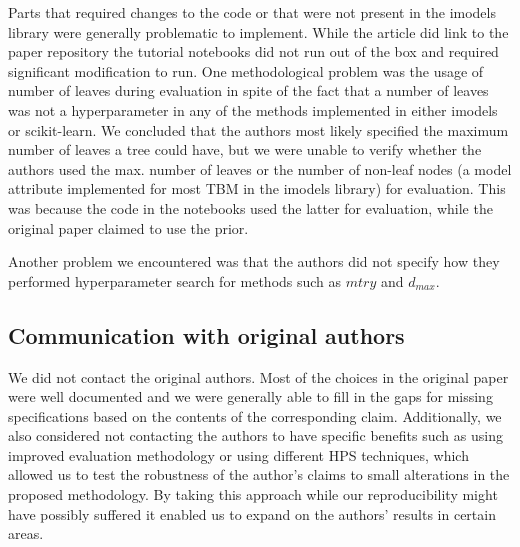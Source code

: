 Parts that required changes to the code or that were not present in the {\sf imodels} library were generally problematic to implement.
While the article did link to the paper repository the tutorial notebooks did not run out of the box and required significant modification to run.
One methodological problem was the usage of number of leaves during evaluation in spite of the fact that a number of leaves was not a hyperparameter in any of the methods implemented in either {\sf imodels} or {\sf scikit-learn}.
We concluded that the authors most likely specified the maximum number of leaves a tree could have, but we were unable to verify whether the authors used the max. number of leaves or the number of non-leaf nodes (a model attribute implemented for most TBM in the {\sf imodels} library) for evaluation. 
This was because the code in the notebooks used the latter for evaluation, while the original paper claimed to use the prior.

Another problem we encountered was that the authors did not specify how they performed hyperparameter search for methods such as $mtry$ and $d_{max}$. %

\subsection{Communication with original authors}

We did not contact the original authors. Most of the choices in the original paper were well documented and we were generally able to fill in the gaps for missing specifications based on the contents of the corresponding claim.
Additionally, we also considered not contacting the authors to have specific benefits such as using improved evaluation methodology or using different HPS techniques, which allowed us to test the robustness of the author's claims to small alterations in the proposed methodology. 
By taking this approach while our reproducibility might have possibly suffered it enabled us to expand on the authors' results in certain areas.
